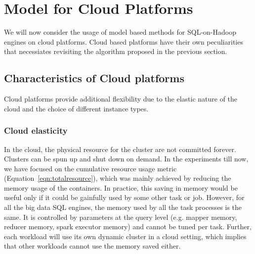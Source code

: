 \section{Model for Cloud Platforms}
\label{sec:modelcloud}
We will now consider the usage of model based methods for SQL-on-Hadoop engines on cloud platforms. Cloud based platforms have their own peculiarities that necessiates revisiting the algorithm proposed in the previous section. 

\subsection{Characteristics of Cloud platforms}
Cloud platforms provide additional flexibility due to the elastic nature of the cloud and the choice of different instance types.

\noindent\subsubsection*{Cloud elasticity}
 In the cloud, the physical resource for the cluster are not committed forever. Clusters can be spun up and shut down on demand. In the  experiments till now, we have focused on the cumulative resource usage metric (Equation~\ref{eqn:totalresource}), which was mainly achieved by reducing the memory usage of the containers. 
In practice, this saving in memory would be useful only if it could be gainfully used by some other task or job. However, for all the big data SQL engines, the memory used by all the task processes is the same. It is controlled by parameters at the query level (e.g. mapper memory, reducer memory, spark executor memory) and cannot be tuned per task.
Further, each workload will use its own dynamic cluster in a cloud setting, which implies that other workloads cannot use the memory saved either. 

